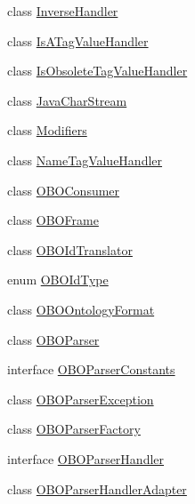 \begin{DoxyCompactItemize}
\item 
class \hyperlink{classorg_1_1coode_1_1owlapi_1_1obo_1_1parser_1_1_inverse_handler}{Inverse\-Handler}
\item 
class \hyperlink{classorg_1_1coode_1_1owlapi_1_1obo_1_1parser_1_1_is_a_tag_value_handler}{Is\-A\-Tag\-Value\-Handler}
\item 
class \hyperlink{classorg_1_1coode_1_1owlapi_1_1obo_1_1parser_1_1_is_obsolete_tag_value_handler}{Is\-Obsolete\-Tag\-Value\-Handler}
\item 
class \hyperlink{classorg_1_1coode_1_1owlapi_1_1obo_1_1parser_1_1_java_char_stream}{Java\-Char\-Stream}
\item 
class \hyperlink{classorg_1_1coode_1_1owlapi_1_1obo_1_1parser_1_1_modifiers}{Modifiers}
\item 
class \hyperlink{classorg_1_1coode_1_1owlapi_1_1obo_1_1parser_1_1_name_tag_value_handler}{Name\-Tag\-Value\-Handler}
\item 
class \hyperlink{classorg_1_1coode_1_1owlapi_1_1obo_1_1parser_1_1_o_b_o_consumer}{O\-B\-O\-Consumer}
\item 
class \hyperlink{classorg_1_1coode_1_1owlapi_1_1obo_1_1parser_1_1_o_b_o_frame}{O\-B\-O\-Frame}
\item 
class \hyperlink{classorg_1_1coode_1_1owlapi_1_1obo_1_1parser_1_1_o_b_o_id_translator}{O\-B\-O\-Id\-Translator}
\item 
enum \hyperlink{enumorg_1_1coode_1_1owlapi_1_1obo_1_1parser_1_1_o_b_o_id_type}{O\-B\-O\-Id\-Type}
\item 
class \hyperlink{classorg_1_1coode_1_1owlapi_1_1obo_1_1parser_1_1_o_b_o_ontology_format}{O\-B\-O\-Ontology\-Format}
\item 
class \hyperlink{classorg_1_1coode_1_1owlapi_1_1obo_1_1parser_1_1_o_b_o_parser}{O\-B\-O\-Parser}
\item 
interface \hyperlink{interfaceorg_1_1coode_1_1owlapi_1_1obo_1_1parser_1_1_o_b_o_parser_constants}{O\-B\-O\-Parser\-Constants}
\item 
class \hyperlink{classorg_1_1coode_1_1owlapi_1_1obo_1_1parser_1_1_o_b_o_parser_exception}{O\-B\-O\-Parser\-Exception}
\item 
class \hyperlink{classorg_1_1coode_1_1owlapi_1_1obo_1_1parser_1_1_o_b_o_parser_factory}{O\-B\-O\-Parser\-Factory}
\item 
interface \hyperlink{interfaceorg_1_1coode_1_1owlapi_1_1obo_1_1parser_1_1_o_b_o_parser_handler}{O\-B\-O\-Parser\-Handler}
\item 
class \hyperlink{classorg_1_1coode_1_1owlapi_1_1obo_1_1parser_1_1_o_b_o_parser_handler_adapter}{O\-B\-O\-Parser\-Handler\-Adapter}

\end{DoxyCompactItemize}
